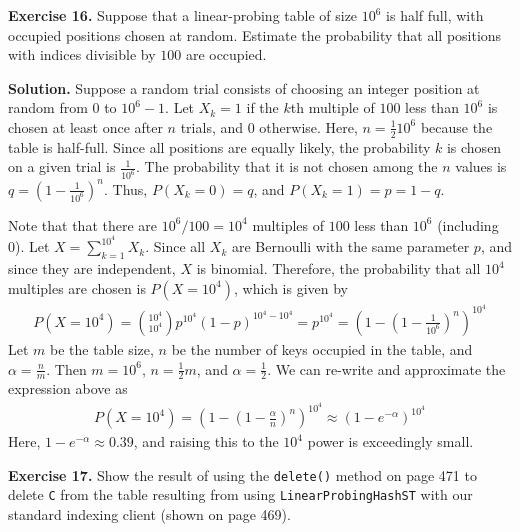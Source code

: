 \documentclass[12pt, a4paper]{article}
\newenvironment{ex}[2][Exercise]
{\par\medskip\noindent \textbf{#1 #2.}}
{\medskip}
\newenvironment{sol}[1][Solution]
{\par\medskip\noindent \textbf{#1.} }
{\medskip}
\begin{document}
	\begin{ex}{16}
		Suppose that a linear-probing table of size $10^6$ is half full, with occupied positions
		chosen at random. Estimate the probability that all positions with indices divisible
		by $100$ are occupied.
	\end{ex}
	\begin{sol}
		Suppose a random trial consists of choosing an integer position at random from $0$ to
		$10^6-1$. Let $X_k=1$ if the $k$th multiple of $100$ less than $10^6$ is chosen 
		at least once after $n$ trials, and $0$ otherwise. Here, $n=\frac{1}{2}10^6$ because
		the table is half-full.
		Since all positions are equally likely, the probability $k$ is chosen on a given trial
		is $\frac{1}{10^6}$. The probability that it is not chosen among the $n$ values
		is $q=\left(1-\frac{1}{10^6}\right)^n$. Thus, $P(X_k=0)=q$, and $P(X_k=1)=p=1-q$.
		
		Note that that there are $10^6/100=10^4$ multiples of $100$ less than $10^6$ (including 0).
		Let $X=\sum_{k=1}^{10^4}X_k$. Since all $X_k$ are Bernoulli with the same parameter
		$p$, and since they are independent, $X$ is binomial. Therefore, the probability that all
		$10^4$ multiples are chosen is $P(X=10^4)$, which is given by
		\begin{align*}
			P(X=10^4)=\binom{10^4}{10^4}p^{10^4}(1-p)^{10^4-10^4}=
			p^{10^4}=\left(1-\left(1-\frac{1}{10^6}\right)^n\right)^{10^4}
		\end{align*}
		Let $m$ be the table size, $n$ be the number of keys occupied in the table, and
		$\alpha=\frac{n}{m}$. Then $m=10^6$, $n=\frac{1}{2}m$, and $\alpha=\frac{1}{2}$.
		We can re-write and approximate the expression above as
		\begin{align*}
			P(X=10^4)=\left(1-\left(1-\frac{\alpha}{n}\right)^n\right)^{10^4}\approx
			(1-e^{-\alpha})^{10^4}
		\end{align*}
		Here, $1-e^{-\alpha}\approx 0.39$, and raising this to the $10^4$ power is exceedingly small.
	\end{sol}
	\begin{ex}{17}
		Show the result of using the \texttt{delete()} method on page 471 to delete \texttt{C} from
		the table resulting from using \texttt{LinearProbingHashST} with our standard indexing client
		(shown on page 469).
	\end{ex}
\end{document}
